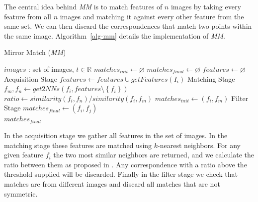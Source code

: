 \documentclass{article}
\begin{document}
%
The central idea behind \emph{MM} is to match features of $n$ images by 
taking every feature from all $n$ images and matching it against every 
other feature from the same set. We can then discard the correspondences 
that match two points within the same image. Algorithm~\ref{alg-mm} details  
the implementation of \emph{MM}.
%
\begin{algorithm}
\caption{Mirror Match (\emph{MM})}
\label{alg-mm}
\begin{algorithmic}
\Require $images$ : set of images, $t \in \mathbb{R}$
\State $matches_{init}\gets \varnothing$
\State $matches_{final}\gets \varnothing$
\State $features\gets \varnothing$
 \Comment Acquisition Stage
	\State $features\gets features \cup getFeatures(I_i)$
\EndFor
{} \Comment Matching Stage
	\State $f_m,f_n \gets get2NNs(f_i, features \setminus 
	\left\{f_i\right\})$
	\State $ratio \gets similarity(f_i, f_n) / similarity(f_i, f_m)$
		\State $matches_{init} \gets \left(f_i, f_m\right)$
	\EndIf
\EndFor
{} \Comment Filter 
Stage
		\State $matches_{final} \gets (f_i, f_j)$
	\EndIf
\EndFor \\
\Return $matches_{final}$
\end{algorithmic}
\end{algorithm}
%
In the acquisition stage we gather all features in the set of images.  
In the matching stage these features are matched using $k$-nearest 
neighbors.  For any given feature $f_i$ the two most similar neighbors 
are returned, and we calculate the ratio between them as proposed in 
\cite{lowe2004sift}.  Any correspondence with a ratio above the 
threshold supplied will be discarded. Finally in the filter stage we 
check that matches are from different images and discard all matches 
that are not symmetric.
%
\end{document}
